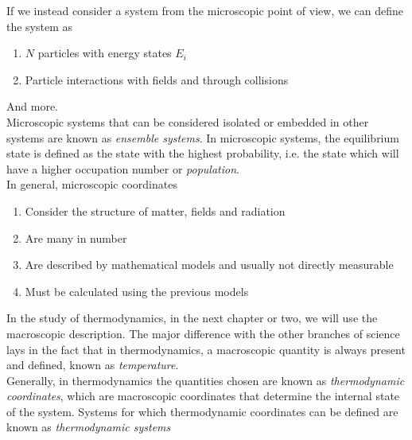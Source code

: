 \documentclass[../qm.tex]{subfiles}
\begin{document}
If we instead consider a system from the microscopic point of view, we can define the system as
\begin{enumerate}
\item $N$ particles with energy states $E_i$
\item Particle interactions with fields and through collisions
\end{enumerate}
And more.\\
Microscopic systems that can be considered isolated or embedded in other systems are known as \textit{ensemble systems}. In microscopic systems, the equilibrium state is defined as the state with the highest probability, i.e. the state which will have a higher occupation number or \textit{population}.\\
In general, microscopic coordinates
\begin{enumerate}
\item Consider the structure of matter, fields and radiation
\item Are many in number
\item Are described by mathematical models and usually not directly measurable
\item Must be calculated using the previous models
\end{enumerate}
In the study of thermodynamics, in the next chapter or two, we will use the macroscopic description. The major difference with the other branches of science lays in the fact that in thermodynamics, a macroscopic quantity is always present and defined, known as \textit{temperature}.\\
Generally, in thermodynamics the quantities chosen are known as \textit{thermodynamic coordinates}, which are macroscopic coordinates that determine the internal state of the system. Systems for which thermodynamic coordinates can be defined are known as \textit{thermodynamic systems}
\end{document}
